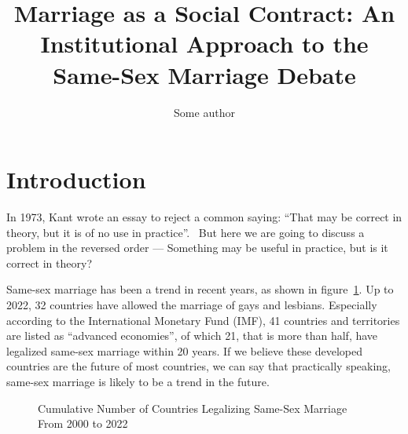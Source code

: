 \documentclass[man,floatsintext]{apa7}
\title{Marriage as a Social Contract: An Institutional Approach to the Same-Sex Marriage Debate}
\author{Some author}
\begin{document}
\maketitle{}
\tableofcontents

\newpage

\section{Introduction}
In 1973, Kant wrote an essay to reject a common saying: ``That may be correct in theory, but it is of no use in practice''.~\autocite{kantCommonSayingThat2009} But here we are going to discuss a problem in the reversed order --- Something may be useful in practice, but is it correct in theory? 

Same-sex marriage has been a trend in recent years, as shown in figure~\ref{Cumu}. Up to 2022, 32 countries have allowed the marriage of gays and lesbians. Especially according to the International Monetary Fund (IMF), 41 countries and territories are listed as ``advanced economies'', of which 21, that is more than half, have legalized same-sex marriage within 20 years. If we believe these developed countries are the future of most countries, we can say that practically speaking, same-sex marriage is likely to be a trend in the future.


\begin{figure}[H]
    \centering
        
    \caption{Cumulative Number of Countries Legalizing Same-Sex Marriage From 2000 to 2022~\autocite{perper32CountriesWorld2022}}
    \label{Cumu}
\end{figure}
    
\end{document}
